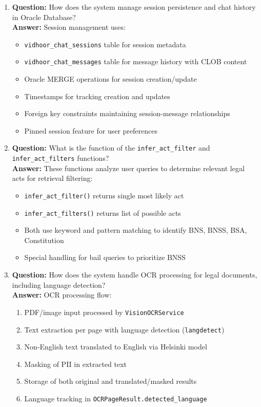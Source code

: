 \documentclass[11pt]{article}
\begin{document}
\begin{enumerate}
\item \textbf{Question:} How does the system manage session persistence and chat history in Oracle Database?
\\ \textbf{Answer:} Session management uses:
\begin{itemize}
\item \texttt{vidhoor\_chat\_sessions} table for session metadata
\item \texttt{vidhoor\_chat\_messages} table for message history with CLOB content
\item Oracle MERGE operations for session creation/update
\item Timestamps for tracking creation and updates
\item Foreign key constraints maintaining session-message relationships
\item Pinned session feature for user preferences
\end{itemize}

\item \textbf{Question:} What is the function of the \texttt{infer\_act\_filter} and \texttt{infer\_act\_filters} functions?
\\ \textbf{Answer:} These functions analyze user queries to determine relevant legal acts for retrieval filtering:
\begin{itemize}
\item \texttt{infer\_act\_filter()} returns single most likely act
\item \texttt{infer\_act\_filters()} returns list of possible acts
\item Both use keyword and pattern matching to identify BNS, BNSS, BSA, Constitution
\item Special handling for bail queries to prioritize BNSS
\end{itemize}

\item \textbf{Question:} How does the system handle OCR processing for legal documents, including language detection?
\\ \textbf{Answer:} OCR processing flow:
\begin{enumerate}
\item PDF/image input processed by \texttt{VisionOCRService}
\item Text extraction per page with language detection (\texttt{langdetect})
\item Non-English text translated to English via Helsinki model
\item Masking of PII in extracted text
\item Storage of both original and translated/masked results
\item Language tracking in \texttt{OCRPageResult.detected\_language}
\end{enumerate}


\end{enumerate}
\end{document}
